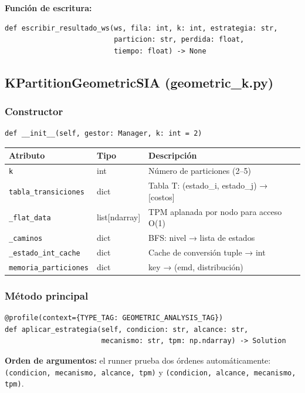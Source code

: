 \documentclass[12pt,a4paper]{article}
\begin{document}
\textbf{Función de escritura:}
\begin{lstlisting}
def escribir_resultado_ws(ws, fila: int, k: int, estrategia: str,
                          particion: str, perdida: float,
                          tiempo: float) -> None
\end{lstlisting}

\subsection{KPartitionGeometricSIA (geometric\_k.py)}

\subsubsection{Constructor}
\begin{lstlisting}
def __init__(self, gestor: Manager, k: int = 2)
\end{lstlisting}

\begin{longtable}{lll}
    \toprule
    Atributo & Tipo & Descripción \\
    \midrule
    \endhead
    \texttt{k} & int & Número de particiones (2--5) \\
    \texttt{tabla\_transiciones} & dict & Tabla T: (estado\_i, estado\_j) → [costos] \\
    \texttt{\_flat\_data} & list[ndarray] & TPM aplanada por nodo para acceso O(1) \\
    \texttt{\_caminos} & dict & BFS: nivel → lista de estados \\
    \texttt{\_estado\_int\_cache} & dict & Cache de conversión tuple → int \\
    \texttt{memoria\_particiones} & dict & key → (emd, distribución) \\
    \bottomrule
\end{longtable}

\subsubsection{Método principal}
\begin{lstlisting}
@profile(context={TYPE_TAG: GEOMETRIC_ANALYSIS_TAG})
def aplicar_estrategia(self, condicion: str, alcance: str,
                       mecanismo: str, tpm: np.ndarray) -> Solution
\end{lstlisting}

\begin{notebox}
\textbf{Orden de argumentos:} el runner prueba dos órdenes automáticamente: \\
\texttt{(condicion, mecanismo, alcance, tpm)} y \texttt{(condicion, alcance, mecanismo, tpm)}.
\end{notebox}
\end{document}

